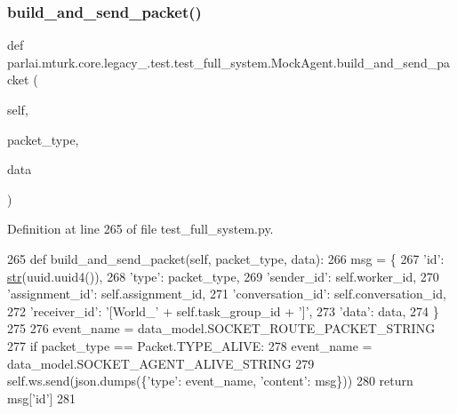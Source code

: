 \subsubsection{\texorpdfstring{build\+\_\+and\+\_\+send\+\_\+packet()}{build\_and\_send\_packet()}}
{\footnotesize\ttfamily def parlai.\+mturk.\+core.\+legacy\+\_.\+test.\+test\+\_\+full\+\_\+system.\+Mock\+Agent.\+build\+\_\+and\+\_\+send\+\_\+packet (\begin{DoxyParamCaption}\item[{}]{self,  }\item[{}]{packet\+\_\+type,  }\item[{}]{data }\end{DoxyParamCaption})}



Definition at line 265 of file test\+\_\+full\+\_\+system.\+py.


\begin{DoxyCode}
265     \textcolor{keyword}{def }build\_and\_send\_packet(self, packet\_type, data):
266         msg = \{
267             \textcolor{stringliteral}{'id'}: \hyperlink{namespacegenerate__task__READMEs_a5b88452ffb87b78c8c85ececebafc09f}{str}(uuid.uuid4()),
268             \textcolor{stringliteral}{'type'}: packet\_type,
269             \textcolor{stringliteral}{'sender\_id'}: self.worker\_id,
270             \textcolor{stringliteral}{'assignment\_id'}: self.assignment\_id,
271             \textcolor{stringliteral}{'conversation\_id'}: self.conversation\_id,
272             \textcolor{stringliteral}{'receiver\_id'}: \textcolor{stringliteral}{'[World\_'} + self.task\_group\_id + \textcolor{stringliteral}{']'},
273             \textcolor{stringliteral}{'data'}: data,
274         \}
275 
276         event\_name = data\_model.SOCKET\_ROUTE\_PACKET\_STRING
277         \textcolor{keywordflow}{if} packet\_type == Packet.TYPE\_ALIVE:
278             event\_name = data\_model.SOCKET\_AGENT\_ALIVE\_STRING
279         self.ws.send(json.dumps(\{\textcolor{stringliteral}{'type'}: event\_name, \textcolor{stringliteral}{'content'}: msg\}))
280         \textcolor{keywordflow}{return} msg[\textcolor{stringliteral}{'id'}]
281 
\end{DoxyCode}
\mbox{\label{classparlai_1_1mturk_1_1core_1_1legacy__2018_1_1test_1_1test__full__system_1_1MockAgent_a85d55e9838b31689c8bba73150d046b0}} 
